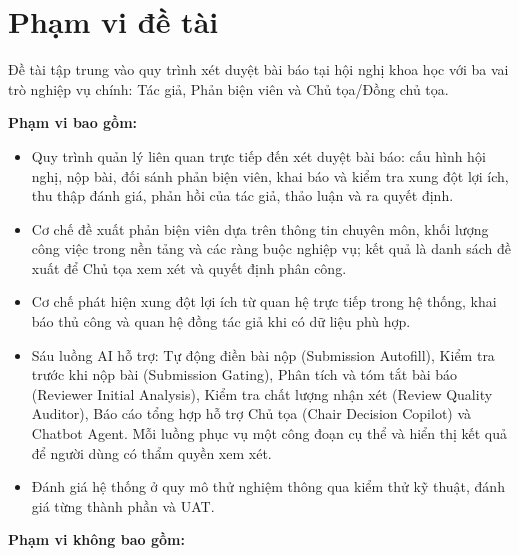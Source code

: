 \section{Phạm vi đề tài}

Đề tài tập trung vào quy trình xét duyệt bài báo tại hội nghị khoa học với ba vai trò nghiệp vụ chính: Tác giả, Phản biện viên và Chủ tọa/Đồng chủ tọa.

\textbf{Phạm vi bao gồm:}

\begin{itemize}
\item Quy trình quản lý liên quan trực tiếp đến xét duyệt bài báo: cấu hình hội nghị, nộp bài, đối sánh phản biện viên, khai báo và kiểm tra xung đột lợi ích, thu thập đánh giá, phản hồi của tác giả, thảo luận và ra quyết định.
\item Cơ chế đề xuất phản biện viên dựa trên thông tin chuyên môn, khối lượng công việc trong nền tảng và các ràng buộc nghiệp vụ; kết quả là danh sách đề xuất để Chủ tọa xem xét và quyết định phân công.
\item Cơ chế phát hiện xung đột lợi ích từ quan hệ trực tiếp trong hệ thống, khai báo thủ công và quan hệ đồng tác giả khi có dữ liệu phù hợp.
\item Sáu luồng AI hỗ trợ: Tự động điền bài nộp (Submission Autofill), Kiểm tra trước khi nộp bài (Submission Gating), Phân tích và tóm tắt bài báo (Reviewer Initial Analysis), Kiểm tra chất lượng nhận xét (Review Quality Auditor), Báo cáo tổng hợp hỗ trợ Chủ tọa (Chair Decision Copilot) và Chatbot Agent. Mỗi luồng phục vụ một công đoạn cụ thể và hiển thị kết quả để người dùng có thẩm quyền xem xét.
\item Đánh giá hệ thống ở quy mô thử nghiệm thông qua kiểm thử kỹ thuật, đánh giá từng thành phần và UAT.
\end{itemize}

\textbf{Phạm vi không bao gồm:}

